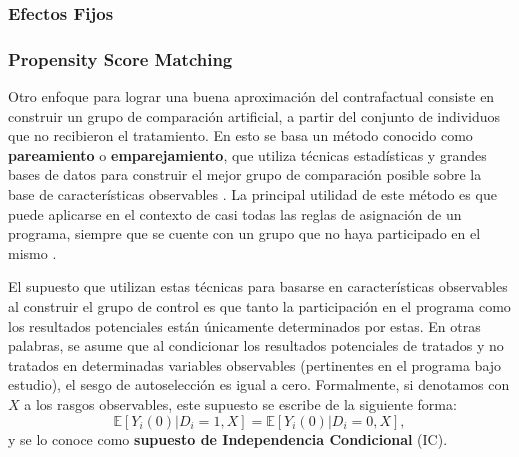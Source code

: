 \documentclass[../../main.tex]{subfiles}
\begin{document}


\subsubsection{Efectos Fijos}

\subsubsection{Propensity Score Matching}

Otro enfoque para lograr una buena aproximación del contrafactual consiste en construir un
grupo de comparación artificial, a partir del conjunto de individuos que no recibieron el
tratamiento. En esto se basa un método conocido como \textbf{pareamiento} o
\textbf{emparejamiento}, que utiliza técnicas estadísticas y grandes bases de datos para
construir el mejor grupo de comparación posible sobre la base de características
observables \cite{gertler-2016}. La principal utilidad de este método es que puede
aplicarse en el contexto de casi todas las reglas de asignación de un programa, siempre
que se cuente con un grupo que no haya participado en el mismo \cite{gertler-2016}.

El supuesto que utilizan estas técnicas para basarse en características observables al
construir el grupo de control es que tanto la participación en el programa como los
resultados potenciales están únicamente determinados por estas. En otras palabras, se
asume que al condicionar los resultados potenciales de tratados y no tratados en
determinadas variables observables (pertinentes en el programa bajo estudio), el sesgo de
autoselección es igual a cero. Formalmente, si denotamos con \(X\) a los rasgos
observables, este supuesto se escribe de la siguiente forma:
\begin{equation}
    \mathbb{E}\left[Y_i(0)|D_i=1, X\right] = \mathbb{E}\left[Y_i(0)|D_i=0, X\right],
\end{equation}
y se lo conoce como \textbf{supuesto de Independencia Condicional} (IC). 
\end{document}
